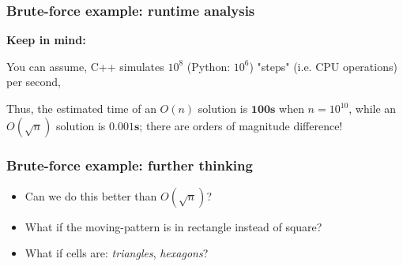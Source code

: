\documentclass{beamer}
\begin{document}
\begin{frame}
  \frametitle{Brute-force example: runtime analysis}

\textbf{Keep in mind:}

You can assume, C++ simulates $10^8$ (Python: $10^6$) "steps" (i.e. CPU operations) per second,

\vspace{3mm}
Thus, the estimated time of an $O(n)$ solution is $\mathbf{100s}$ when $n=10^{10}$, 
while an $O(\sqrt{n})$ solution is $\mathbf{0.001s}$; there are orders of magnitude difference!

\end{frame}

\begin{frame}
  \frametitle{Brute-force example: further thinking}
\begin{itemize}
  \item Can we do this better than $O(\sqrt{n})$?
  \item What if the moving-pattern is in rectangle instead of square?
  \item What if cells are: \textit{triangles}, \textit{hexagons}?
\end{itemize}  

\end{frame}
\end{document}
